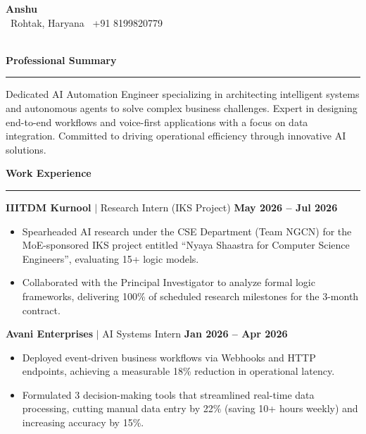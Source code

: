 \documentclass[letterpaper,10pt]{article}
\newcommand{\resumeSection}[2]{
  \vspace{4pt}
  \textbf{\large\color{primaryblue}#1\hspace{0.5em}#2}
  \vspace{1pt}
  {\color{primaryblue}\hrule}
  \vspace{2.5pt}
}
\begin{document}
\begin{center}
    {\Huge\bfseries\color{primaryblue} Anshu} \\ \vspace{4pt}
    \small
    \color{charcoal}
    \faMapMarkerAlt\ Rohtak, Haryana \hspace{10pt}
    \faPhone*\ +91 8199820779 \hspace{10pt}
    \faEnvelope\ \href{mailto:anshuh027@gmail.com}{\color{charcoal}{anshuh027@gmail.com}} \\ \vspace{2pt}
    \faLinkedin\ \href{https://linkedin.com/in/anshu-hooda-289524282}{\color{charcoal}{linkedin.com/in/anshu-hooda-289524282}} \hspace{10pt}
    \faGlobe\ \href{https://anshuhooda.netlify.app}{\color{charcoal}{anshuhooda.netlify.app}} \hspace{10pt}
    \faGithub\ \href{https://github.com/AnshuHOD}{\color{charcoal}{github.com/AnshuHOD}}
\end{center}


\resumeSection{\faUser}{Professional Summary}
\small{Dedicated AI Automation Engineer specializing in architecting intelligent systems and autonomous agents to solve complex business challenges. Expert in designing end-to-end workflows and voice-first applications with a focus on data integration. Committed to driving operational efficiency through innovative AI solutions.}


\resumeSection{\faBriefcase}{Work Experience}

\noindent
\textbf{IIITDM Kurnool} $|$ Research Intern (IKS Project) \hfill \textbf{May 2026 -- Jul 2026}
\begin{itemize}
    \item Spearheaded AI research under the CSE Department (Team NGCN) for the MoE-sponsored IKS project entitled ``Nyaya Shaastra for Computer Science Engineers'', evaluating 15+ logic models.
    \item Collaborated with the Principal Investigator to analyze formal logic frameworks, delivering 100\% of scheduled research milestones for the 3-month contract.
\end{itemize}

\vspace{2.5pt}
\noindent
\textbf{Avani Enterprises} $|$ AI Systems Intern \hfill \textbf{Jan 2026 -- Apr 2026}
\begin{itemize}
    \item Deployed event-driven business workflows via Webhooks and HTTP endpoints, achieving a measurable 18\% reduction in operational latency.
    \item Formulated 3 decision-making tools that streamlined real-time data processing, cutting manual data entry by 22\% (saving 10+ hours weekly) and increasing accuracy by 15\%.
\end{itemize}
\end{document}
